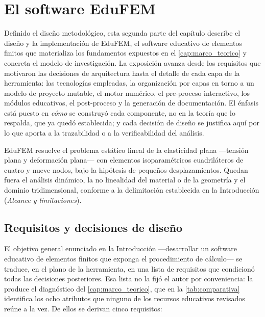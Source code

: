 \section{El software EduFEM}
\label{sec:diseno-edufem}

Definido el diseño metodológico, esta segunda parte del capítulo describe el diseño y la implementación de EduFEM, el software educativo de elementos finitos que materializa los fundamentos expuestos en el \autoref{cap:marco_teorico} y concreta el modelo de investigación. La exposición avanza desde los requisitos que motivaron las decisiones de arquitectura hasta el detalle de cada capa de la herramienta: las tecnologías empleadas, la organización por capas en torno a un modelo de proyecto mutable, el motor numérico, el pre-proceso interactivo, los módulos educativos, el post-proceso y la generación de documentación. El énfasis está puesto en \emph{cómo} se construyó cada componente, no en la teoría que lo respalda, que ya quedó establecida; y cada decisión de diseño se justifica aquí por lo que aporta a la trazabilidad o a la verificabilidad del análisis.

EduFEM resuelve el problema estático lineal de la elasticidad plana —tensión plana y deformación plana— con elementos isoparamétricos cuadriláteros de cuatro y nueve nodos, bajo la hipótesis de pequeños desplazamientos. Quedan fuera el análisis dinámico, la no linealidad del material o de la geometría y el dominio tridimensional, conforme a la delimitación establecida en la Introducción (\emph{Alcance y limitaciones}).

\subsection{Requisitos y decisiones de diseño}
\label{sec:requisitos}

El objetivo general enunciado en la Introducción —desarrollar un software educativo de elementos finitos que exponga el procedimiento de cálculo— se traduce, en el plano de la herramienta, en una lista de requisitos que condicionó todas las decisiones posteriores. Esa lista no la fijó el autor por conveniencia: la produce el diagnóstico del \autoref{cap:marco_teorico}, que en la \autoref{tab:comparativa} identifica los ocho atributos que ninguno de los recursos educativos revisados reúne a la vez. De ellos se derivan cinco requisitos:

